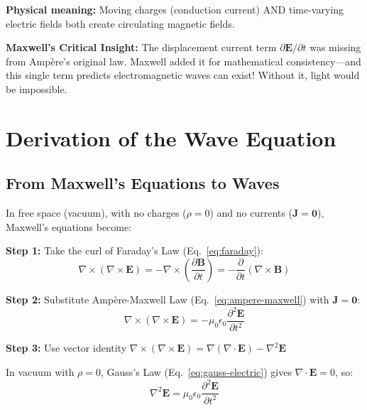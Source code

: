 \textbf{Physical meaning:} Moving charges (conduction current) AND time-varying electric fields both create circulating magnetic fields.

\begin{keyconcept}
\textbf{Maxwell's Critical Insight:} The displacement current term $\partial \mathbf{E}/\partial t$ was missing from Ampère's original law. Maxwell added it for mathematical consistency---and this single term predicts electromagnetic waves can exist! Without it, light would be impossible.
\end{keyconcept}

\section{Derivation of the Wave Equation}

\subsection{From Maxwell's Equations to Waves}

In free space (vacuum), with no charges ($\rho = 0$) and no currents ($\mathbf{J} = \mathbf{0}$), Maxwell's equations become:

\textbf{Step 1:} Take the curl of Faraday's Law (Eq.~\ref{eq:faraday}):
\begin{equation}
\nabla \times (\nabla \times \mathbf{E}) = -\nabla \times \left(\frac{\partial \mathbf{B}}{\partial t}\right) = -\frac{\partial}{\partial t}(\nabla \times \mathbf{B})
\label{eq:curl-faraday}
\end{equation}

\textbf{Step 2:} Substitute Ampère-Maxwell Law (Eq.~\ref{eq:ampere-maxwell}) with $\mathbf{J} = \mathbf{0}$:
\begin{equation}
\nabla \times (\nabla \times \mathbf{E}) = -\mu_0 \epsilon_0 \frac{\partial^2 \mathbf{E}}{\partial t^2}
\label{eq:curl-sub}
\end{equation}

\textbf{Step 3:} Use vector identity $\nabla \times (\nabla \times \mathbf{E}) = \nabla(\nabla \cdot \mathbf{E}) - \nabla^2 \mathbf{E}$

In vacuum with $\rho = 0$, Gauss's Law (Eq.~\ref{eq:gauss-electric}) gives $\nabla \cdot \mathbf{E} = 0$, so:
\begin{equation}
\boxed{\nabla^2 \mathbf{E} = \mu_0 \epsilon_0 \frac{\partial^2 \mathbf{E}}{\partial t^2}}
\label{eq:wave-E}
\end{equation}

